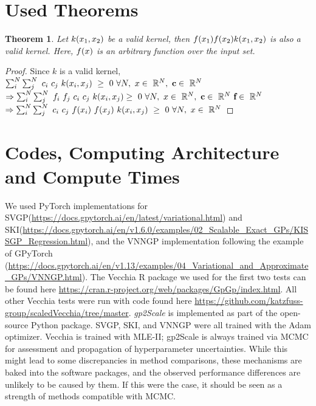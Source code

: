 \documentclass{article}
\newtheorem{theorem}{Theorem}
\renewcommand{\mathbf}[1]{%
  \ifx#1x x\else \textbf{#1}\fi
}
\begin{document}
\section{Used Theorems} \label{app:A}
\begin{theorem}\label{theorem:ff}
Let $k(\mathbf{x}_1,\mathbf{x}_2)$ be a valid kernel, then $f(\mathbf{x}_1)f(\mathbf{x}_2)k(\mathbf{x}_1,\mathbf{x}_2)$ is also a valid kernel. Here, $f(\mathbf{x})$ is an arbitrary function over the input set.
\end{theorem}
\begin{proof} Since $k$ is a valid kernel, 
$\sum_i^N\sum_j^N~ c_i~c_j~k(\mathbf{x}_i,\mathbf{x}_j)~\geq~0 ~\forall N,~\mathbf{x}\in~\mathbb{R}^N, ~\mathbf{c}\in~\mathbb{R}^N$ \\
$\Rightarrow \sum_i^N\sum_j^N~ f_i~f_j~c_i~c_j~k(\mathbf{x}_i,\mathbf{x}_j) \\
\geq~0 ~\forall N,~\mathbf{x}\in~\mathbb{R}^N, ~\mathbf{c}\in~\mathbb{R}^N ~\mathbf{f}\in~\mathbb{R}^N$ \\
$\Rightarrow \sum_i^N\sum_j^N~c_i~c_j~f(\mathbf{x}_i)~f(\mathbf{x}_j)~k(\mathbf{x}_i,\mathbf{x}_j)~\geq~0~\forall N,~\mathbf{x}\in~\mathbb{R}^N$
\end{proof}

\section{Codes, Computing Architecture and Compute Times}
We used PyTorch implementations for SVGP(\url{https://docs.gpytorch.ai/en/latest/variational.html}) and SKI(\url{https://docs.gpytorch.ai/en/v1.6.0/examples/02_Scalable_Exact_GPs/KISSGP_Regression.html}), and the VNNGP implementation following the example of GPyTorch (\url{https://docs.gpytorch.ai/en/v1.13/examples/04_Variational_and_Approximate_GPs/VNNGP.html}). 
The Vecchia R package we used for the first two tests can be found here \url{https://cran.r-project.org/web/packages/GpGp/index.html}. All other Vecchia tests were run with code found here \url{https://github.com/katzfuss-group/scaledVecchia/tree/master}.
\emph{gp2Scale} is implemented as part of the  open-source Python package. 
SVGP, SKI, and VNNGP were all trained with the Adam optimizer. Vecchia is trained with MLE-II; gp2Scale is always trained via MCMC for assessment and propagation of hyperparameter uncertainties. While this might lead to some discrepancies in method comparisons, these mechanisms are baked into the software packages, and the observed performance differences are unlikely to be caused by them. If this were the case, it should be seen as a strength of methods compatible with MCMC. 
\end{document}
